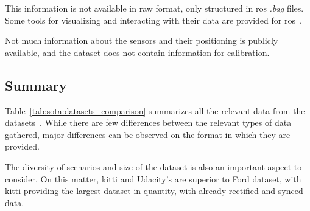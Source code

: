 This information is not available in raw format, only structured in \ac{ros} \textit{.bag} files. Some tools for visualizing and interacting with their data are provided for \ac{ros}~\cite{udacity}. 

Not much information about the sensors and their positioning is publicly available, and the dataset does not contain information for calibration.

\subsection{Summary}
Table~\ref{tab:sota:datasets_comparison} summarizes all the relevant data from the datasets~\cite{udacity, Pandey2011, Geiger2013a}. While there are few differences between the relevant types of data gathered, major differences can be observed on the format in which they are provided. 

The diversity of scenarios and size of the dataset is also an important aspect to consider. On this matter, \ac{kitti} and Udacity's are superior to Ford dataset, with \ac{kitti} providing the largest dataset in quantity, with already rectified and synced data. 
	
